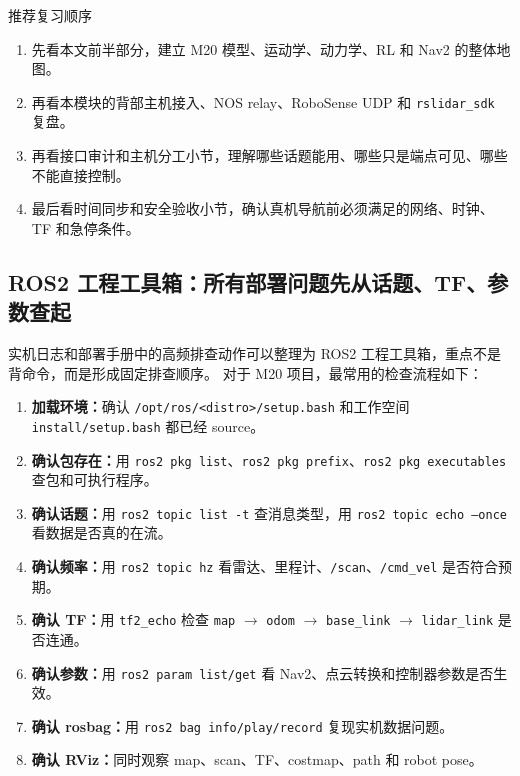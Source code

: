 \documentclass[UTF8,11pt,a4paper]{ctexart}
\begin{document}
\begin{greenbox}{推荐复习顺序}
\begin{enumerate}
  \item 先看本文前半部分，建立 M20 模型、运动学、动力学、RL 和 Nav2 的整体地图。
  \item 再看本模块的背部主机接入、NOS relay、RoboSense UDP 和 \texttt{rslidar\_sdk} 复盘。
  \item 再看接口审计和主机分工小节，理解哪些话题能用、哪些只是端点可见、哪些不能直接控制。
  \item 最后看时间同步和安全验收小节，确认真机导航前必须满足的网络、时钟、TF 和急停条件。
\end{enumerate}
\end{greenbox}

\subsection{ROS2 工程工具箱：所有部署问题先从话题、TF、参数查起}

实机日志和部署手册中的高频排查动作可以整理为 ROS2 工程工具箱，重点不是背命令，而是形成固定排查顺序。
对于 M20 项目，最常用的检查流程如下：

\begin{enumerate}
  \item \textbf{加载环境：}确认 \texttt{/opt/ros/<distro>/setup.bash} 和工作空间 \texttt{install/setup.bash} 都已经 source。
  \item \textbf{确认包存在：}用 \texttt{ros2 pkg list}、\texttt{ros2 pkg prefix}、\texttt{ros2 pkg executables} 查包和可执行程序。
  \item \textbf{确认话题：}用 \texttt{ros2 topic list -t} 查消息类型，用 \texttt{ros2 topic echo --once} 看数据是否真的在流。
  \item \textbf{确认频率：}用 \texttt{ros2 topic hz} 看雷达、里程计、\texttt{/scan}、\texttt{/cmd\_vel} 是否符合预期。
  \item \textbf{确认 TF：}用 \texttt{tf2\_echo} 检查 \texttt{map} \(\rightarrow\) \texttt{odom} \(\rightarrow\) \texttt{base\_link} \(\rightarrow\) \texttt{lidar\_link} 是否连通。
  \item \textbf{确认参数：}用 \texttt{ros2 param list/get} 看 Nav2、点云转换和控制器参数是否生效。
  \item \textbf{确认 rosbag：}用 \texttt{ros2 bag info/play/record} 复现实机数据问题。
  \item \textbf{确认 RViz：}同时观察 map、scan、TF、costmap、path 和 robot pose。
\end{enumerate}
\end{document}
